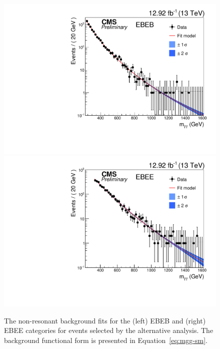 \begin{figure}[htb]
    \centering
    \includegraphics[width=\cmsFigWidth]{HighMassDiphoton/mgg_data_fitEBEB.pdf}
    \includegraphics[width=\cmsFigWidth]{HighMassDiphoton/mgg_data_fitEBEE.pdf} 
    \caption{The non-resonant background fits for the (left) EBEB and
      (right) EBEE categories for events selected by the alternative
      analysis. The background functional form is presented in Equation~\ref{eq:mgg-sm}.
      \label{fig:fitsAlter}
    }
\end{figure}

